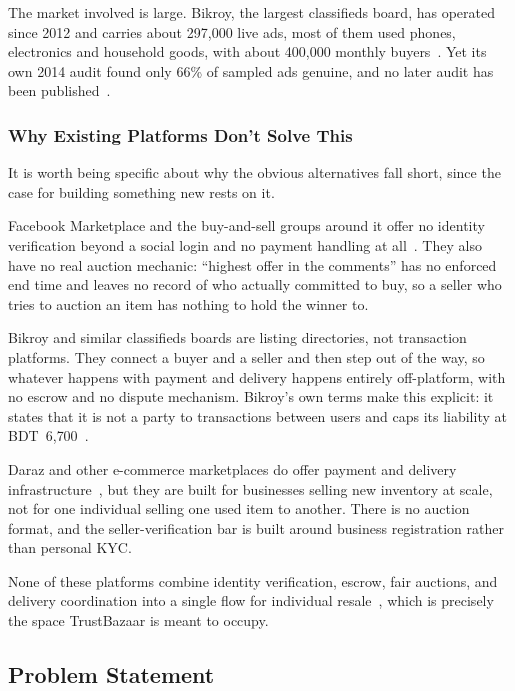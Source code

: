 \documentclass[11pt,a4paper]{article}
\begin{document}
The market involved is large. Bikroy, the largest classifieds board, has operated since 2012 and
carries about 297{,}000 live ads, most of them used phones, electronics and household goods,
with about 400{,}000 monthly buyers~\cite[\S2.3--2.4]{supp}. Yet its own 2014 audit found only 66\%
of sampled ads genuine, and no later audit has been published~\cite[\S2.1]{supp}.

\subsubsection*{Why Existing Platforms Don't Solve This}

It is worth being specific about why the obvious alternatives fall short, since the case for
building something new rests on it.

Facebook Marketplace and the buy-and-sell groups around it offer no identity verification beyond a
social login and no payment handling at all~\cite[\S5.2]{supp}. They also have no real auction
mechanic: ``highest offer in the comments'' has no enforced end time and leaves no record of who
actually committed to buy, so a seller who tries to auction an item has nothing to hold the winner
to.

Bikroy and similar classifieds boards are listing directories, not transaction platforms. They
connect a buyer and a seller and then step out of the way, so whatever happens with payment and
delivery happens entirely off-platform, with no escrow and no dispute mechanism. Bikroy's own terms
make this explicit: it states that it is not a party to transactions between users and caps its
liability at BDT~6{,}700~\cite[\S2.1]{supp}.

Daraz and other e-commerce marketplaces do offer payment and delivery
infrastructure~\cite[\S5.3]{supp}, but they are built for businesses selling new inventory at scale,
not for one individual selling one used item to another. There is no auction format, and the
seller-verification bar is built around business registration rather than personal KYC.

None of these platforms combine identity verification, escrow, fair auctions, and delivery
coordination into a single flow for individual resale~\cite[\S5.5]{supp}, which is precisely the
space TrustBazaar is meant to occupy.

\subsection{Problem Statement}
\end{document}
